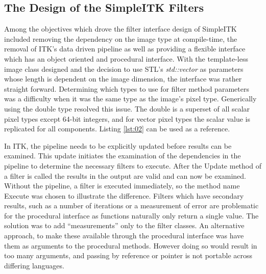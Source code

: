 \documentclass{frontiersMED} %
\begin{document}
\subsection{The Design of the SimpleITK Filters}
Among the objectives which drove the filter interface design of
SimpleITK included removing the dependency on the image type at
compile-time, the removal of ITK's data driven pipeline as well as
providing a flexible interface which has an object oriented and
procedural interface. With the template-less image class designed and
the decision to use STL's \textit{std::vector} as parameters whose length is
dependent on the image dimension, the interface was rather straight
forward. Determining which types to use for filter method parameters
was a difficulty when it was the same type as the image's pixel
type. Generically using the double type resolved this issue. The
double is a superset of all scalar pixel types except 64-bit integers,
and for vector pixel types the scalar value is replicated for all
components. Listing \ref{lst:02} can be used as a reference.



In ITK, the pipeline needs to be explicitly updated before results can
be examined. This update initiates the examination of the dependencies
in the pipeline to determine the necessary filters to execute. After
the Update method of a filter is called the results in the output are
valid and can now be examined. Without the pipeline, a filter is
executed immediately, so the method name Execute was chosen to
illustrate the difference. Filters which have secondary results, such
as a number of iterations or a measurement of error are problematic
for the procedural interface as functions naturally only return a
single value. The solution was to add ``measurements'' only to the
filter classes. An alternative approach, to make these available
through the procedural interface was  have them as arguments to the
procedural methods. However doing so would result in too many
arguments, and passing by reference or pointer is not portable across
differing languages.
\end{document}
